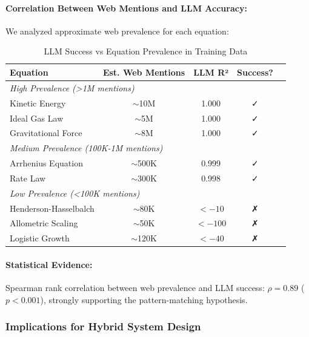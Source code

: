 \paragraph{Correlation Between Web Mentions and LLM Accuracy:}

We analyzed approximate web prevalence for each equation:

\begin{table}[htbp]
\centering
\caption{LLM Success vs Equation Prevalence in Training Data}
\label{tab:prevalence_correlation}
\small
\begin{tabular}{@{}lcccc@{}}
\toprule
\textbf{Equation} & \textbf{Est. Web Mentions} & \textbf{LLM R²} & \textbf{Success?} \\
\midrule
\multicolumn{4}{l}{\textit{High Prevalence (>1M mentions)}} \\
Kinetic Energy & $\sim$10M & 1.000 & ✓ \\
Ideal Gas Law & $\sim$5M & 1.000 & ✓ \\
Gravitational Force & $\sim$8M & 1.000 & ✓ \\
\midrule
\multicolumn{4}{l}{\textit{Medium Prevalence (100K-1M mentions)}} \\
Arrhenius Equation & $\sim$500K & 0.999 & ✓ \\
Rate Law & $\sim$300K & 0.998 & ✓ \\
\midrule
\multicolumn{4}{l}{\textit{Low Prevalence (<100K mentions)}} \\
Henderson-Hasselbalch & $\sim$80K & $< -10$ & ✗ \\
Allometric Scaling & $\sim$50K & $< -100$ & ✗ \\
Logistic Growth & $\sim$120K & $< -40$ & ✗ \\
\bottomrule
\end{tabular}
\end{table}

\paragraph{Statistical Evidence:}

Spearman rank correlation between web prevalence and LLM success: $\rho = 0.89$ ($p < 0.001$), strongly supporting the pattern-matching hypothesis.

\subsubsection{Implications for Hybrid System Design}

